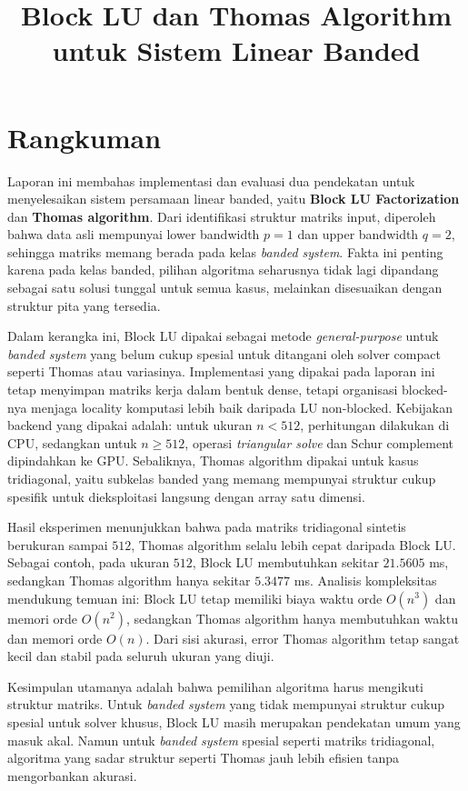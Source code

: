\documentclass[12pt,a4paper]{article}
\title{Block LU dan Thomas Algorithm untuk Sistem Linear Banded}
\author{}
\date{}
\begin{document}
\maketitle

\section*{Rangkuman}
Laporan ini membahas implementasi dan evaluasi dua pendekatan untuk menyelesaikan sistem persamaan linear banded, yaitu \textbf{Block LU Factorization} dan \textbf{Thomas algorithm}. Dari identifikasi struktur matriks input, diperoleh bahwa data asli mempunyai lower bandwidth $p=1$ dan upper bandwidth $q=2$, sehingga matriks memang berada pada kelas \emph{banded system}. Fakta ini penting karena pada kelas banded, pilihan algoritma seharusnya tidak lagi dipandang sebagai satu solusi tunggal untuk semua kasus, melainkan disesuaikan dengan struktur pita yang tersedia.

Dalam kerangka ini, Block LU dipakai sebagai metode \emph{general-purpose} untuk \emph{banded system} yang belum cukup spesial untuk ditangani oleh solver compact seperti Thomas atau variasinya. Implementasi yang dipakai pada laporan ini tetap menyimpan matriks kerja dalam bentuk dense, tetapi organisasi blocked-nya menjaga locality komputasi lebih baik daripada LU non-blocked. Kebijakan backend yang dipakai adalah: untuk ukuran $n<512$, perhitungan dilakukan di CPU, sedangkan untuk $n\geq512$, operasi \emph{triangular solve} dan Schur complement dipindahkan ke GPU. Sebaliknya, Thomas algorithm dipakai untuk kasus tridiagonal, yaitu subkelas banded yang memang mempunyai struktur cukup spesifik untuk dieksploitasi langsung dengan array satu dimensi.

Hasil eksperimen menunjukkan bahwa pada matriks tridiagonal sintetis berukuran sampai $512$, Thomas algorithm selalu lebih cepat daripada Block LU. Sebagai contoh, pada ukuran $512$, Block LU membutuhkan sekitar $21.5605$ ms, sedangkan Thomas algorithm hanya sekitar $5.3477$ ms. Analisis kompleksitas mendukung temuan ini: Block LU tetap memiliki biaya waktu orde $O(n^3)$ dan memori orde $O(n^2)$, sedangkan Thomas algorithm hanya membutuhkan waktu dan memori orde $O(n)$. Dari sisi akurasi, error Thomas algorithm tetap sangat kecil dan stabil pada seluruh ukuran yang diuji.

Kesimpulan utamanya adalah bahwa pemilihan algoritma harus mengikuti struktur matriks. Untuk \emph{banded system} yang tidak mempunyai struktur cukup spesial untuk solver khusus, Block LU masih merupakan pendekatan umum yang masuk akal. Namun untuk \emph{banded system} spesial seperti matriks tridiagonal, algoritma yang sadar struktur seperti Thomas jauh lebih efisien tanpa mengorbankan akurasi.
\end{document}
